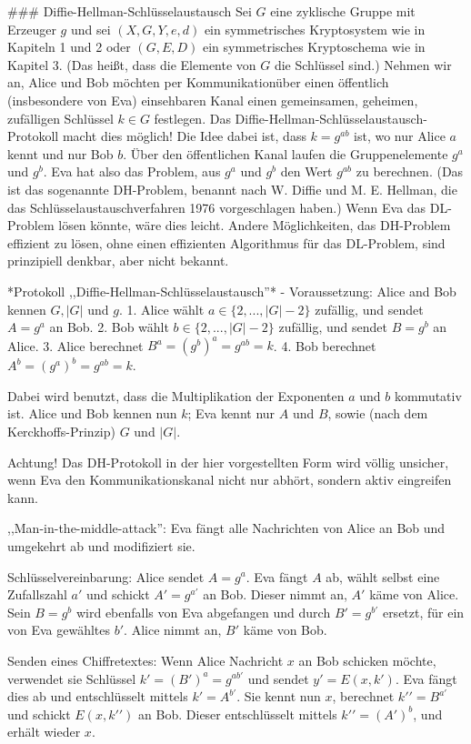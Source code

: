 \documentclass[a4paper]{article}
\begin{document}
\begin{multicols}{3}
{{{{### Diffie-Hellman-Schlüsselaustausch
Sei $G$ eine zyklische Gruppe mit Erzeuger $g$ und sei $(X,G,Y,e,d)$ ein symmetrisches Kryptosystem wie in Kapiteln 1 und 2 oder $(G,E,D)$ ein symmetrisches Kryptoschema wie in Kapitel 3. (Das heißt, dass die Elemente von $G$ die Schlüssel sind.) Nehmen wir an, Alice und Bob möchten per Kommunikationüber einen öffentlich (insbesondere von Eva) einsehbaren Kanal einen gemeinsamen, geheimen, zufälligen Schlüssel $k\in G$ festlegen. Das Diffie-Hellman-Schlüsselaustausch-Protokoll macht dies möglich!
Die Idee dabei ist, dass $k=g^{ab}$ ist, wo nur Alice $a$ kennt und nur Bob $b$. Über den öffentlichen Kanal laufen die Gruppenelemente $g^a$ und $g^b$. Eva hat also das Problem, aus $g^a$ und $g^b$ den Wert $g^{ab}$ zu berechnen. (Das ist das sogenannte DH-Problem,
benannt nach W. Diffie und M. E. Hellman, die das Schlüsselaustauschverfahren 1976 vorgeschlagen haben.) Wenn Eva das DL-Problem lösen könnte, wäre dies leicht. Andere Möglichkeiten, das DH-Problem effizient zu lösen, ohne einen effizienten Algorithmus für das DL-Problem, sind prinzipiell denkbar, aber nicht bekannt. 

*Protokoll ,,Diffie-Hellman-Schlüsselaustausch''*
- Voraussetzung: Alice and Bob kennen $G,|G|$ und $g$.
1. Alice wählt $a\in\{2 ,...,|G|- 2\}$ zufällig, und sendet $A=g^a$ an Bob.
2. Bob wählt $b\in\{2 ,...,|G|-2\}$ zufällig, und sendet $B=g^b$ an Alice.
3. Alice berechnet $B^a= (g^b)^a=g^{ab}=k$.
4. Bob berechnet $A^b= (g^a)^b=g^{ab}=k$.

Dabei wird benutzt, dass die Multiplikation der Exponenten $a$ und $b$ kommutativ ist. Alice und Bob kennen nun $k$; Eva kennt nur $A$ und $B$, sowie (nach dem Kerckhoffs-Prinzip) $G$ und $|G|$.

Achtung! Das DH-Protokoll in der hier vorgestellten Form wird völlig unsicher, wenn Eva den Kommunikationskanal nicht nur abhört, sondern aktiv eingreifen kann. 

,,Man-in-the-middle-attack'': Eva fängt alle Nachrichten von Alice an Bob und umgekehrt ab und modifiziert sie.

Schlüsselvereinbarung: Alice sendet $A=g^a$. Eva fängt $A$ ab, wählt selbst eine Zufallszahl $a′$ und schickt $A′=g^{a′}$ an Bob. Dieser nimmt an, $A′$ käme von Alice. Sein $B=g^b$ wird ebenfalls von Eva abgefangen und durch $B′=g^{b′}$ ersetzt, für ein von Eva gewähltes $b′$. Alice nimmt an, $B′$ käme von Bob.

Senden eines Chiffretextes: Wenn Alice Nachricht $x$ an Bob schicken möchte, verwendet sie Schlüssel $k′= (B′)^a=g^{ab'}$ und sendet $y′=E(x,k′)$. Eva fängt dies ab und entschlüsselt mittels $k′=A^{b′}$. Sie kennt nun $x$, berechnet $k′′=B^{a′}$ und schickt $E(x,k′′)$ an Bob. Dieser entschlüsselt mittels $k′′= (A′)^b$, und erhält wieder $x$.

}}}}
\end{multicols}
\end{document}
